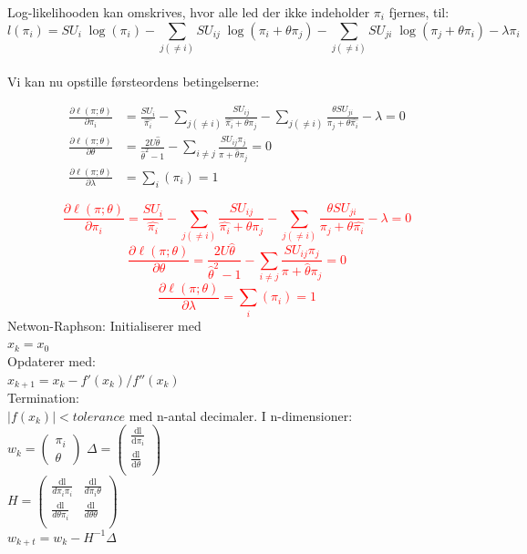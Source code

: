 \documentclass[11pt,a4paper]{article}
\begin{document}
Log-likelihooden kan omskrives, hvor alle led der ikke indeholder $\pi_i$ fjernes, til:
$$l(\pi_i)=SU_i \; \log(\pi_i) - \sum_{j(\neq i)}SU_{ij}\;\log(\pi_i + \theta \pi_j) - \sum_{j(\neq i)} SU_{ji}\; \log(\pi_j + \theta \pi_i)-\lambda \pi_i$$
\\
Vi kan nu opstille førsteordens betingelserne: 
\begin{equations}
\begin{align}
 \frac{\partial \ell(\pi;\theta)}{\partial \pi_i}&= 
\frac{SU_i}{\hat{\pi_i}}-\sum_{j(\neq i)}\frac{SU_{ij}}{\hat{\pi_i}+\theta \pi_j}-\sum_{j(\neq i)}\frac{\theta SU_{ji}}{\pi_j + \theta \hat{\pi_i}}-\lambda=0\\
\frac{\partial \ell(\pi;\theta)}{\partial \theta}&=
\frac{2U\hat{\theta}}{\hat{\theta}^2-1}-\sum_{i \neq j}\frac{SU_{ij}\pi_j}{\pi+\hat{\theta}\pi_j}=0\\
\frac{\partial \ell(\pi;\theta)}{\partial \lambda}&=
\sum_i(\pi_i)=1
\end{align}
\end{equations}
\textcolor{red}{
\begin{equation}
\frac{\partial \ell(\pi;\theta)}{\partial \pi_i}= 
\frac{SU_i}{\hat{\pi_i}}-\sum_{j(\neq i)}\frac{SU_{ij}}{\hat{\pi_i}+\theta \pi_j}-\sum_{j(\neq i)}\frac{\theta SU_{ji}}{\pi_j + \theta \hat{\pi_i}}-\lambda=0
\end{equation}
\begin{equation}
\frac{\partial \ell(\pi;\theta)}{\partial \theta}=
\frac{2U\hat{\theta}}{\hat{\theta}^2-1}-\sum_{i \neq j}\frac{SU_{ij}\pi_j}{\pi+\hat{\theta}\pi_j}=0
\end{equation}
\begin{equation}
\frac{\partial \ell(\pi;\theta)}{\partial \lambda}=\sum_i(\pi_i)=1
\end{equation}
}
Netwon-Raphson:
Initialiserer med\\ $x_{k} = x_0$\\
Opdaterer med:\\
$x_{k+1}=x_{k}-f'(x_{k})/f''(x_{k})$\\
Termination:\\
$|f(x_{k})|< tolerance$ med n-antal decimaler.
I n-dimensioner:\\
$
w_{k} = \left(
\begin{array}{c}
\pi_i\\
\theta
\end{array}
\right) 
$
$
\Delta=\left(
\begin{array}{c}
 \frac{\text{dl}}{\text{d$\pi $}_i} \\
 \frac{\text{dl}}{\text{d$\theta $}} \\
\end{array}
\right)
$
\\
$
H=\left(
\begin{array}{cc}
 \frac{\text{dl}}{d \pi _i \pi _i} & \frac{\text{dl}}{d   \pi _i \theta} \\
 \frac{\text{dl}}{d \theta  \pi _i} & \frac{\text{dl}}{d \theta \theta } \\
\end{array}
\right)
$
\\
$
w_{k+t}=w_k-H^{-1}\Delta
$
\end{document}
